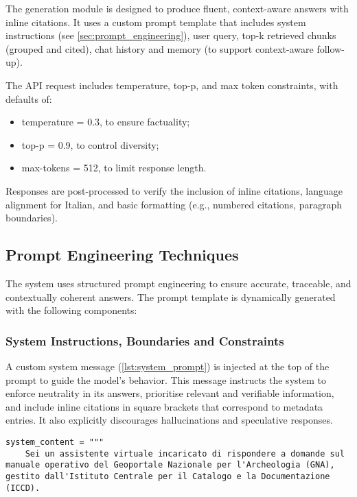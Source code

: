 \begin{spacing}{1.5}
The generation module is designed to produce fluent, context-aware answers with inline citations. It uses a custom prompt template that includes system instructions (see \autoref{sec:prompt_engineering}), user query, top-k retrieved chunks (grouped and cited), chat history and memory (to support context-aware follow-up).

The API request includes temperature, top-p, and max token constraints, with defaults of:
\begin{itemize}
      \item temperature = 0.3, to ensure factuality;
      \item top-p = 0.9, to control diversity;
      \item max-tokens = 512, to limit response length.
\end{itemize}

Responses are post-processed to verify the inclusion of inline citations, language alignment for Italian, and basic formatting (e.g., numbered citations, paragraph boundaries).

\subsection{Prompt Engineering Techniques} \label{sec:prompt_engineering}
The system uses structured prompt engineering to ensure accurate, traceable, and contextually coherent answers. The prompt template is dynamically generated with the following components:

\noindent\subsubsection*{\large System Instructions, Boundaries and Constraints}
A custom system message (\autoref{lst:system_prompt}) is injected at the top of the prompt to guide the model’s behavior. This message instructs the system to enforce neutrality in its answers, prioritise relevant and verifiable information, and include inline citations in square brackets that correspond to metadata entries. It also explicitly discourages hallucinations and speculative responses.

\vspace{0.6em}
\begin{lstlisting}[breaklines=true,
                  frame=none,
                   caption={System prompt specifying assistant constraints and response instructions.},
                   captionpos=b,
                   label={lst:system_prompt}]
system_content = """
    Sei un assistente virtuale incaricato di rispondere a domande sul manuale operativo del Geoportale Nazionale per l'Archeologia (GNA), gestito dall'Istituto Centrale per il Catalogo e la Documentazione (ICCD).


\end{lstlisting}
\end{spacing}
